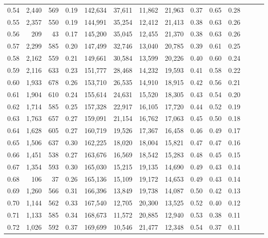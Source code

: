 \begin{tabular}{rrrrrrrrrrrrrr}
0.54 &  2,440 &  569 &  0.19 &  142,634 &   37,611 &  11,862 &  21,963 &  0.37 &  0.65 &      0.28 \\
0.55 &  2,357 &  550 &  0.19 &  144,991 &   35,254 &  12,412 &  21,413 &  0.38 &  0.63 &      0.26 \\
0.56 &    209 &   43 &  0.17 &  145,200 &   35,045 &  12,455 &  21,370 &  0.38 &  0.63 &      0.26 \\
0.57 &  2,299 &  585 &  0.20 &  147,499 &   32,746 &  13,040 &  20,785 &  0.39 &  0.61 &      0.25 \\
0.58 &  2,162 &  559 &  0.21 &  149,661 &   30,584 &  13,599 &  20,226 &  0.40 &  0.60 &      0.24 \\
0.59 &  2,116 &  633 &  0.23 &  151,777 &   28,468 &  14,232 &  19,593 &  0.41 &  0.58 &      0.22 \\
0.60 &  1,933 &  678 &  0.26 &  153,710 &   26,535 &  14,910 &  18,915 &  0.42 &  0.56 &      0.21 \\
0.61 &  1,904 &  610 &  0.24 &  155,614 &   24,631 &  15,520 &  18,305 &  0.43 &  0.54 &      0.20 \\
0.62 &  1,714 &  585 &  0.25 &  157,328 &   22,917 &  16,105 &  17,720 &  0.44 &  0.52 &      0.19 \\
0.63 &  1,763 &  657 &  0.27 &  159,091 &   21,154 &  16,762 &  17,063 &  0.45 &  0.50 &      0.18 \\
0.64 &  1,628 &  605 &  0.27 &  160,719 &   19,526 &  17,367 &  16,458 &  0.46 &  0.49 &      0.17 \\
0.65 &  1,506 &  637 &  0.30 &  162,225 &   18,020 &  18,004 &  15,821 &  0.47 &  0.47 &      0.16 \\
0.66 &  1,451 &  538 &  0.27 &  163,676 &   16,569 &  18,542 &  15,283 &  0.48 &  0.45 &      0.15 \\
0.67 &  1,354 &  593 &  0.30 &  165,030 &   15,215 &  19,135 &  14,690 &  0.49 &  0.43 &      0.14 \\
0.68 &    106 &   37 &  0.26 &  165,136 &   15,109 &  19,172 &  14,653 &  0.49 &  0.43 &      0.14 \\
0.69 &  1,260 &  566 &  0.31 &  166,396 &   13,849 &  19,738 &  14,087 &  0.50 &  0.42 &      0.13 \\
0.70 &  1,144 &  562 &  0.33 &  167,540 &   12,705 &  20,300 &  13,525 &  0.52 &  0.40 &      0.12 \\
0.71 &  1,133 &  585 &  0.34 &  168,673 &   11,572 &  20,885 &  12,940 &  0.53 &  0.38 &      0.11 \\
0.72 &  1,026 &  592 &  0.37 &  169,699 &   10,546 &  21,477 &  12,348 &  0.54 &  0.37 &      0.11 \\

\end{tabular}
